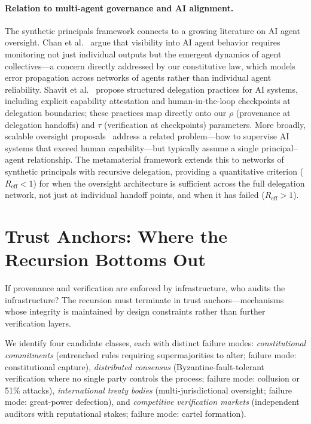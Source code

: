 \documentclass[runningheads]{llncs}
\begin{document}
\paragraph{Relation to multi-agent governance and AI alignment.}
The synthetic principals framework connects to a growing literature on AI agent oversight. Chan et al.~\cite{chan2024visibility} argue that visibility into AI agent behavior requires monitoring not just individual outputs but the emergent dynamics of agent collectives---a concern directly addressed by our constitutive law, which models error propagation across networks of agents rather than individual agent reliability. Shavit et al.~\cite{shavit2023practices} propose structured delegation practices for AI systems, including explicit capability attestation and human-in-the-loop checkpoints at delegation boundaries; these practices map directly onto our $\rho$ (provenance at delegation handoffs) and $\tau$ (verification at checkpoints) parameters. More broadly, scalable oversight proposals~\cite{christiano2017deep,bowman2022measuring} address a related problem---how to supervise AI systems that exceed human capability---but typically assume a single principal--agent relationship. The metamaterial framework extends this to networks of synthetic principals with recursive delegation, providing a quantitative criterion ($R_{\mathrm{eff}} < 1$) for when the oversight architecture is sufficient across the full delegation network, not just at individual handoff points, and when it has failed ($R_{\mathrm{eff}} > 1$).


\section{Trust Anchors: Where the Recursion Bottoms Out}
\label{sec:trust}

If provenance and verification are enforced by infrastructure, who audits the infrastructure? The recursion must terminate in trust anchors---mechanisms whose integrity is maintained by design constraints rather than further verification layers.

We identify four candidate classes, each with distinct failure modes: \emph{constitutional commitments} (entrenched rules requiring supermajorities to alter; failure mode: constitutional capture), \emph{distributed consensus} (Byzantine-fault-tolerant verification where no single party controls the process; failure mode: collusion or 51\% attacks), \emph{international treaty bodies} (multi-jurisdictional oversight; failure mode: great-power defection), and \emph{competitive verification markets} (independent auditors with reputational stakes; failure mode: cartel formation).
\end{document}

